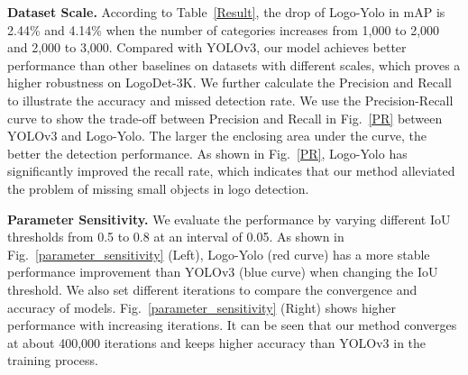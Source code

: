 \documentclass[journal]{IEEEtran}
\begin{document}
\textbf{Dataset Scale.} According to Table~\ref{Result}, the drop of Logo-Yolo in mAP is 2.44\% and 4.14\% when the number of categories increases from 1,000 to 2,000 and 2,000 to 3,000. Compared with YOLOv3, our model achieves better performance than other baselines on datasets with different scales, which proves a higher robustness on LogoDet-3K. We further calculate the Precision and Recall to illustrate the accuracy and missed detection rate. We use the Precision-Recall curve to show the trade-off between Precision and Recall in Fig.~\ref{PR} between YOLOv3 and Logo-Yolo. The larger the enclosing area under the curve, the better the detection performance. As shown in Fig.~\ref{PR}, Logo-Yolo has significantly improved the recall rate, which indicates that our method alleviated the problem of missing small objects  in logo detection. 



\textbf{Parameter Sensitivity.} We evaluate the performance by varying different IoU thresholds from 0.5 to 0.8 at an interval of 0.05. As shown in Fig.~\ref{parameter_sensitivity} (Left), Logo-Yolo (red curve) has a more stable performance improvement than YOLOv3 (blue curve) when changing the IoU threshold. We also set different iterations to compare the convergence and accuracy of models. Fig.~\ref{parameter_sensitivity} (Right) shows higher performance with increasing iterations. It can be seen that our method converges at about 400,000 iterations and keeps higher accuracy than YOLOv3 in the training process.
\begin{table}[!t]
	\caption{Evaluation on individual modules and two modules of Logo-Yolo (\%).}
	\label{Ablation}
	\centering
\end{table}
\end{document}
